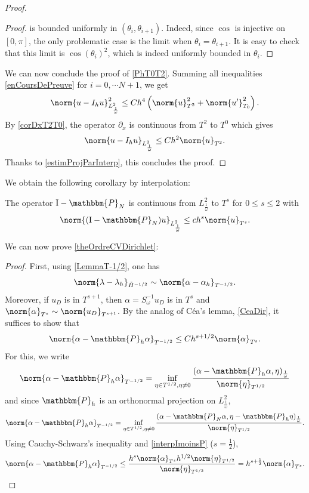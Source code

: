 \documentclass[a4paper]{article}
\begin{document}
\begin{proof}
\begin{proof}
		is bounded uniformly in $(\theta_i, \theta_{i+1})$. Indeed, since $\cos$ is injective on $[0,\pi]$, the only problematic case is the limit when $\theta_i = \theta_{i+1}$. It is easy to check that this limit is $\cos(\theta_i)^2$, which is indeed uniformly bounded in $\theta_i$. 	
	\end{proof}
	\noindent We can now conclude the proof of \autoref{PhT0T2}. Summing all inequalities \eqref{enCoursDePreuve} for $i = 0, \cdots N+1$, we get 
	\[\norm{u - I_h u}_{L^2_\frac{1}{\omega}}^2 \leq Ch^4 \left( \norm{u}_{T^2}^2 + \norm{u'}_{T_0}^2\right).\]
	By \autoref{corDxT2T0}, the operator $\partial_x$ is continuous from $T^2$ to $T^0$ which gives 
	\[\norm{u - I_hu}_{L^2_\frac{1}{\omega}} \leq Ch^2 \norm{u}_{T^2}.\]
	Thanks to \eqref{estimProjParInterp}, this concludes the proof. 
\end{proof}
\noindent We obtain the following corollary by interpolation:
\begin{Cor}
	\label{interpImoinsP}
	The operator $\textup{I} - \mathbbm{P}_N$ is continuous from $L^2_\frac{1}{\omega}$ to $T^s$ for $0 \leq s \leq 2$ with
	\[\norm{(\textup{I} - \mathbbm{P}_N)u}_{L^2_\frac{1}{\omega}} \leq c h^s \norm{u}_{T^s}.\]
\end{Cor}
\noindent We can now prove \autoref{theOrdreCVDirichlet}:
\begin{proof}
	First, using \autoref{LemmaT-1/2}, one has 
	\[\norm{\lambda - \lambda_h}_{\tilde{H}^{-1/2}} \sim \norm{\alpha - \alpha_h}_{T^{-1/2}}.\]
	Moreover, if $u_D$ is in $T^{s+1}$, then $\alpha = S_\omega^{-1} u_D$ is in $T^s$ and $\norm{\alpha}_{T^s} \sim \norm{u_D}_{T^{s+1}}$. 	
	By the analog of Céa's lemma, \autoref{CeaDir}, it suffices to show that 
	\[ \norm{\alpha - \mathbbm{P}_h \alpha}_{T^{-1/2}} \leq C h^{s + 1/2} \norm{\alpha}_{T^s}.\]
	For this, we write
	\[\norm{\alpha - \mathbbm{P}_h \alpha}_{T^{-1/2}} = \inf_{\eta \in T^{1/2}, \eta \neq 0} \dfrac{(\alpha - \mathbbm{P}_h \alpha,\eta)_{\frac{1}{\omega}}}{\norm{\eta}_{T^{1/2}}}\]
	and since $\mathbbm{P}_h$ is an orthonormal projection on $L^2_\frac{1}{\omega}$, 
	\[\norm{\alpha - \mathbbm{P}_h \alpha}_{T^{-1/2}} = \inf_{\eta \in T^{1/2}, \eta \neq 0} \dfrac{(\alpha - \mathbbm{P}_N \alpha,\eta -\mathbbm{P}_h \eta )_{\frac{1}{\omega}}}{\norm{\eta}_{T^{1/2}}}.\]
	Using Cauchy-Schwarz's inequality and \autoref{interpImoinsP} ($s = \frac{1}{2}$), 
	\[\norm{\alpha - \mathbbm{P}_h \alpha}_{T^{-1/2}} \leq \dfrac{h^s \norm{\alpha}_{T^s} h^{1/2}\norm{\eta}_{T^{1/2}}}{\norm{\eta}_{T^{1/2}}} = h^{s+\frac{1}{2}} \norm{\alpha}_{T^s}.\]
\end{proof}
\end{document}
